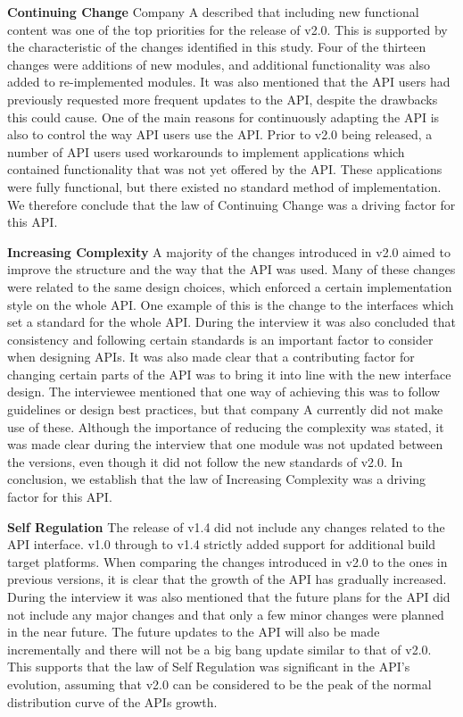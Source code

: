 \documentclass{sig-alternate}
\begin{document}
\smallskip \noindent
\textbf{Continuing Change  } 
Company A described that including new functional content was one of the top priorities for the release of v2.0. This is supported by the characteristic of the changes identified in this study. Four of the thirteen changes were additions of new modules, and additional functionality was also added to re-implemented modules. It was also mentioned that the API users had previously requested more frequent updates to the API, despite the drawbacks this could cause. One of the main reasons for continuously adapting the API is also to control the way API users use the API. Prior to v2.0 being released, a number of API users used workarounds to implement applications which contained functionality that was not yet offered by the API. These applications were fully functional, but there existed no standard method of implementation. We therefore conclude that the law of Continuing Change was a driving factor for this API. 

\smallskip \noindent
\textbf{Increasing Complexity  } \label{sec:law2} 
A majority of the changes introduced in v2.0 aimed to improve the structure and the way that the API was used. Many of these changes were related to the same design choices, which enforced a certain implementation style on the whole API. One example of this is the change to the interfaces which set a standard for the whole API. During the interview it was also concluded that consistency and following certain standards is an important factor to consider when designing APIs. It was also made clear that a contributing factor for changing certain parts of the API was to bring it into line with the new interface design. The interviewee mentioned that one way of achieving this was to follow guidelines or design best practices, but that company A currently did not make use of these. Although the importance of reducing the complexity was stated, it was made clear during the interview that one module was not updated between the versions, even though it did not follow the new standards of v2.0. In conclusion, we establish that the law of Increasing Complexity was a driving factor for this API. 

\smallskip \noindent
\textbf{Self Regulation  } \label{sec:law3} 
The release of v1.4 did not include any changes related to the API interface. v1.0 through to v1.4 strictly added support for additional build target platforms. When comparing the changes introduced in v2.0 to the ones in previous versions, it is clear that the growth of the API has gradually increased. During the interview it was also mentioned that the future plans for the API did not include any major changes and that only a few minor changes were planned in the near future. The future updates to the API will also be made incrementally and there will not be a big bang update similar to that of v2.0. This supports that the law of Self Regulation was significant in the API's evolution, assuming that v2.0 can be considered to be the peak of the normal distribution curve of the APIs growth. 
\end{document}
